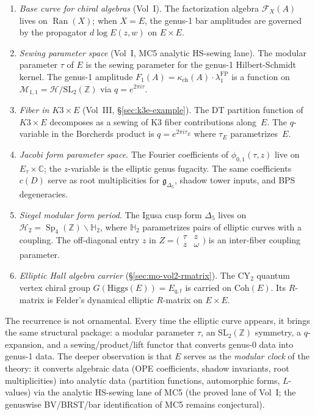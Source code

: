 \documentclass[11pt]{article}
\newcommand{\cF}{\mathcal{F}}
\newcommand{\cM}{\mathcal{M}}
\newcommand{\cH}{\mathcal{H}}
\newcommand{\fg}{\mathfrak{g}}
\newcommand{\C}{\mathbb{C}}
\newcommand{\Z}{\mathbb{Z}}
\newcommand{\bH}{\mathbb{H}}
\newcommand{\Ran}{\operatorname{Ran}}
\newcommand{\Coh}{\mathrm{Coh}}
\newcommand{\Sp}{\operatorname{Sp}}
\begin{document}
\begin{enumerate}[label=(\roman*)]
\item \emph{Base curve for chiral algebras} (Vol~I). The factorization algebra $\cF_X(A)$ lives on $\Ran(X)$; when $X = E$, the genus-1 bar amplitudes are governed by the propagator $d \log E(z,w)$ on $E \times E$.

\item \emph{Sewing parameter space} (Vol~I, MC5 analytic HS-sewing lane). The modular parameter $\tau$ of $E$ is the sewing parameter for the genus-1 Hilbert-Schmidt kernel. The genus-1 amplitude $F_1(A) = \kappa_{\mathrm{ch}}(A) \cdot \lambda_1^{\mathrm{FP}}$ is a function on $\cM_{1,1} = \cH/\mathrm{SL}_2(\Z)$ via $q = e^{2\pi i \tau}$.

\item \emph{Fiber in $K3 \times E$} (Vol~III, \S\ref{sec:k3e-example}). The DT partition function of $K3 \times E$ decomposes as a sewing of K3 fiber contributions along~$E$. The $q$-variable in the Borcherds product is $q = e^{2\pi i \tau_E}$ where $\tau_E$ parametrizes~$E$.

\item \emph{Jacobi form parameter space}. The Fourier coefficients of $\phi_{0,1}(\tau, z)$ live on $E_\tau \times \C$; the $z$-variable is the elliptic genus fugacity. The same coefficients $c(D)$ serve as root multiplicities for $\fg_{\Delta_5}$, shadow tower inputs, and BPS degeneracies.

\item \emph{Siegel modular form period}. The Igusa cusp form $\Delta_5$ lives on $\cH_2 = \Sp_4(\Z) \backslash \bH_2$, where $\bH_2$ parametrizes pairs of elliptic curves with a coupling. The off-diagonal entry $z$ in $Z = \bigl(\begin{smallmatrix} \tau & z \\ z & \omega \end{smallmatrix}\bigr)$ is an inter-fiber coupling parameter.

\item \emph{Elliptic Hall algebra carrier} (\S\ref{sec:mo-vol2-rmatrix}). The CY$_2$ quantum vertex chiral group $G(\mathrm{Higgs}(E)) = E_{q,t}$ is carried on $\Coh(E)$. Its $R$-matrix is Felder's dynamical elliptic $R$-matrix on $E \times E$.
\end{enumerate}

The recurrence is not ornamental. Every time the elliptic curve appears, it brings the same structural package: a modular parameter $\tau$, an $\mathrm{SL}_2(\Z)$ symmetry, a $q$-expansion, and a sewing/product/lift functor that converts genus-0 data into genus-1 data. The deeper observation is that $E$ serves as the \emph{modular clock} of the theory: it converts algebraic data (OPE coefficients, shadow invariants, root multiplicities) into analytic data (partition functions, automorphic forms, $L$-values) via the analytic HS-sewing lane of MC5 (the proved lane of Vol~I; the genuswise BV/BRST/bar identification of MC5 remains conjectural).
\end{document}
